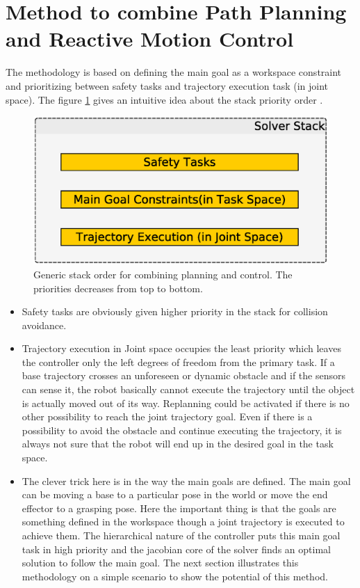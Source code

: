 \section{Method to combine Path Planning and Reactive Motion Control}
The methodology is based on defining the main goal as a workspace constraint and prioritizing between safety tasks and trajectory execution task (in joint space). The figure \ref{gso} gives an intuitive idea about the stack priority order .
   \begin{figure}[thpb]
      \centering
      \includegraphics[scale=0.5]{doa/images/ProposedMethodology.eps}
      \caption{Generic stack order for combining planning and control. The priorities decreases from top to bottom. }
      \label{gso}
   \end{figure}

\begin{itemize}
 \item Safety tasks are obviously given higher priority in the stack for collision avoidance.
 \item Trajectory execution in Joint space occupies the least priority which leaves the controller only the left degrees of freedom from the primary task. If a base trajectory crosses an unforeseen or dynamic obstacle and if the sensors can sense it, the robot basically cannot execute the trajectory until the object is actually moved out of its way. Replanning could be activated if there is no other possibility to reach the joint trajectory goal. Even if there is a possibility to avoid the obstacle and continue executing the  trajectory, it is always not sure that the robot will end up in the desired goal in the task space. 
 
 \item The clever trick here is in the way the main goals are defined. The main goal can be moving a base to a particular pose in the world or move the end effector to a grasping pose. Here the important thing is that the goals are something defined in the workspace though a joint trajectory is executed to achieve them. The hierarchical nature of the controller puts this main goal task in high priority and the jacobian core of the solver finds an optimal solution to follow the main goal. The next section illustrates this methodology on a simple scenario to show the potential of this method.
\end{itemize}
